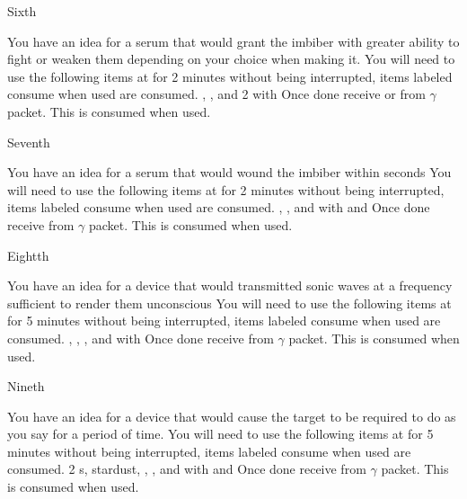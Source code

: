 \documentclass[greennotebook]{guildcamp3} %
\begin{document}
\begin{page}{Sixth}
	
	You have an idea for a serum that would grant the imbiber with greater ability to fight or weaken them depending on your choice when making it.
	You will need to use the following items at \sSciWorkbench{} for 2 minutes without being interrupted, items labeled consume when used are consumed.
	\iCompoundNine{}, \iUnicornHoof{}, and 2 \iScrapMetal{} with \iMultitool{}
	Once done receive \iCRUpSerum{} or \iCRDownSerum{} from $\gamma$ packet. This is consumed when used. 
	
\end{page}

\begin{page}{Seventh}
	
	You have an idea for a serum that would wound the imbiber within seconds
	You will need to use the following items at \sSciWorkbench{} for 2 minutes without being interrupted, items labeled consume when used are consumed.
	\iCompoundNine{}, \iBloodPlasma{}, and \iBelladonna{} with \iCentrifuge{} and \iTestTube{}
	Once done receive \iTechPoison{} from $\gamma$ packet. This is consumed when used. 
	
\end{page}

\begin{page}{Eightth}
	
	You have an idea for a device that would transmitted sonic waves at a frequency sufficient to render them unconscious
	You will need to use the following items at \sSciWorkbench{} for 5 minutes without being interrupted, items labeled consume when used are consumed.
	\iCompoundNine{}, \iOil{}, \iWerewolfFang{}, \iGraphiteLube and \iBelladonna{} with \iLeadPipe{}
	Once done receive \iSonicKO{} from $\gamma$ packet. This is consumed when used. 
	
\end{page}

\begin{page}{Nineth}
	
	You have an idea for a device that would cause the target to be required to do as you say for a period of time.
	You will need to use the following items at \sSciWorkbench{} for 5 minutes without being interrupted, items labeled consume when used are consumed.
	2 \iTransistor{}s, stardust, \iCircuitBoard{}, \iCog{}, and \iGraphiteLube with \iDiamondDrill{} and \iMonoBlade{}
	Once done receive \iMCDevice{} from $\gamma$ packet. This is consumed when used. 
	
\end{page}
\end{document}
